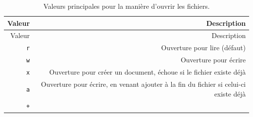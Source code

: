 \documentclass[12pt,]{book}
\numberwithin{equation}{section}
\numberwithin{countremarque}{section}
\begin{document}
\begin{longtable}[]{@{}rr@{}}
\caption{\label{tab:open-mode-ouverture} Valeurs principales pour la manière
d'ouvrir les fichiers.}\tabularnewline
\toprule
\begin{minipage}[b]{0.12\columnwidth}\raggedleft\strut
Valeur\strut
\end{minipage} & \begin{minipage}[b]{0.69\columnwidth}\raggedleft\strut
Description\strut
\end{minipage}\tabularnewline
\midrule
\endfirsthead
\toprule
\begin{minipage}[b]{0.12\columnwidth}\raggedleft\strut
Valeur\strut
\end{minipage} & \begin{minipage}[b]{0.69\columnwidth}\raggedleft\strut
Description\strut
\end{minipage}\tabularnewline
\midrule
\endhead
\begin{minipage}[t]{0.12\columnwidth}\raggedleft\strut
\texttt{r}\strut
\end{minipage} & \begin{minipage}[t]{0.69\columnwidth}\raggedleft\strut
Ouverture pour lire (défaut)\strut
\end{minipage}\tabularnewline
\begin{minipage}[t]{0.12\columnwidth}\raggedleft\strut
\texttt{w}\strut
\end{minipage} & \begin{minipage}[t]{0.69\columnwidth}\raggedleft\strut
Ouverture pour écrire\strut
\end{minipage}\tabularnewline
\begin{minipage}[t]{0.12\columnwidth}\raggedleft\strut
\texttt{x}\strut
\end{minipage} & \begin{minipage}[t]{0.69\columnwidth}\raggedleft\strut
Ouverture pour créer un document, échoue si le fichier existe déjà\strut
\end{minipage}\tabularnewline
\begin{minipage}[t]{0.12\columnwidth}\raggedleft\strut
\texttt{a}\strut
\end{minipage} & \begin{minipage}[t]{0.69\columnwidth}\raggedleft\strut
Ouverture pour écrire, en venant ajouter à la fin du fichier si celui-ci
existe déjà\strut
\end{minipage}\tabularnewline
\begin{minipage}[t]{0.12\columnwidth}\raggedleft\strut
\texttt{+}\strut

\end{minipage}
\end{longtable}
\end{document}

